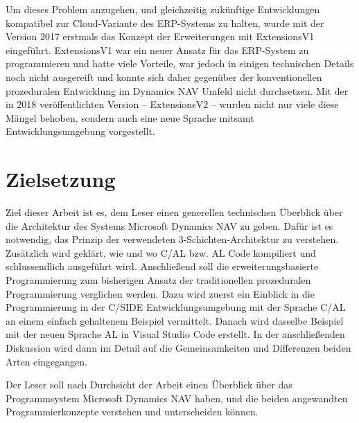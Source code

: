 Um dieses Problem anzugehen, und gleichzeitig zukünftige Entwicklungen kompatibel zur Cloud-Variante des ERP-Systems zu halten, wurde mit der Version 2017 erstmals das Konzept der Erweiterungen mit ExtensionsV1 eingeführt. ExtensionsV1 war ein neuer Ansatz für das ERP-System zu programmieren und hatte viele Vorteile, war jedoch in einigen technischen Details noch nicht ausgereift und konnte sich daher gegenüber der konventionellen prozeduralen Entwicklung im Dynamics NAV Umfeld nicht durchsetzen. Mit der in 2018 veröffentlichten Version -- ExtensionsV2 -- wurden nicht nur viele diese Mängel behoben, sondern auch eine neue Sprache mitsamt Entwicklungsumgebung vorgestellt.

\section{Zielsetzung}
\label{sec:Zielsetzung}
Ziel dieser Arbeit ist es, dem Leser einen generellen technischen Überblick über die Architektur des Systems Microsoft Dynamics NAV zu geben. Dafür ist es notwendig, das Prinzip der verwendeten 3-Schichten-Architektur zu verstehen. Zusätzlich wird geklärt, wie und wo C/AL bzw. AL Code kompiliert und schlussendlich ausgeführt wird. 
Anschließend soll die erweiterungsbasierte Programmierung zum bisherigen Ansatz der traditionellen prozeduralen Programmierung verglichen werden. Dazu wird zuerst ein Einblick in die Programmierung in der C/SIDE Entwicklungsumgebung mit der Sprache C/AL an einem einfach gehaltenem Beispiel vermittelt. Danach wird dasselbe Beispiel mit der neuen Sprache AL in Visual Studio Code erstellt. In der anschließenden Diskussion wird dann im Detail auf die Gemeinsamkeiten und Differenzen beiden Arten eingegangen.  

Der Leser soll nach Durchsicht der Arbeit einen Überblick über das Programmsystem Microsoft Dynamics NAV haben, und die beiden angewandten Programmierkonzepte verstehen und unterscheiden können.


